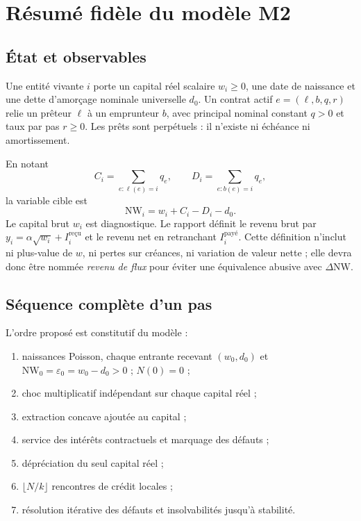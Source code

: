 \documentclass[11pt,a4paper]{article}
\newcommand{\NW}{\mathrm{NW}}
\begin{document}
\section{Résumé fidèle du modèle M2}

\subsection{État et observables}

Une entité vivante $i$ porte un capital réel scalaire $w_i\geq0$, une date de
naissance et une dette d'amorçage nominale universelle $d_0$. Un contrat actif
$e=(\ell,b,q,r)$ relie un prêteur $\ell$ à un emprunteur $b$, avec principal
nominal constant $q>0$ et taux par pas $r\geq0$. Les prêts sont perpétuels : il
n'existe ni échéance ni amortissement.

En notant
\[
 C_i=\sum_{e:\ell(e)=i}q_e,\qquad
 D_i=\sum_{e:b(e)=i}q_e,
\]
la variable cible est
\[
 \NW_i=w_i+C_i-D_i-d_0.
\]
Le capital brut $w_i$ est diagnostique. Le rapport définit le revenu brut par
$y_i=\alpha\sqrt{w_i}+I_i^{\text{reçu}}$ et le revenu net en retranchant
$I_i^{\text{payé}}$. Cette définition n'inclut ni plus-value de $w$, ni pertes sur
créances, ni variation de valeur nette ; elle devra donc être nommée
\emph{revenu de flux} pour éviter une équivalence abusive avec $\Delta\NW$.

\subsection{Séquence complète d'un pas}

L'ordre proposé est constitutif du modèle :
\begin{enumerate}
  \item naissances Poisson, chaque entrante recevant $(w_0,d_0)$ et
  $\NW_0=\varepsilon_0=w_0-d_0>0$ ; $N(0)=0$ ;
  \item choc multiplicatif indépendant sur chaque capital réel ;
  \item extraction concave ajoutée au capital ;
  \item service des intérêts contractuels et marquage des défauts ;
  \item dépréciation du seul capital réel ;
  \item $\lfloor N/k\rfloor$ rencontres de crédit locales ;
  \item résolution itérative des défauts et insolvabilités jusqu'à stabilité.
\end{enumerate}
\end{document}
